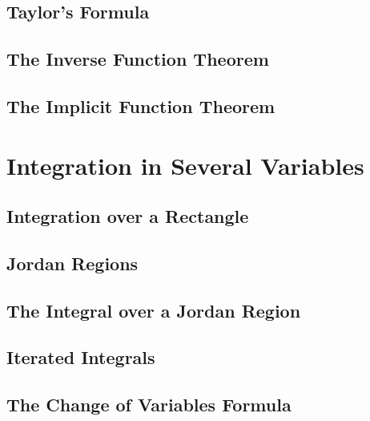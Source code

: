 \documentclass[12pt]{book}
\begin{document}
\section{Taylor's Formula}


\section{The Inverse Function Theorem}

\section{The Implicit Function Theorem}




\chapter{Integration in Several Variables}
\section{Integration over a Rectangle}


\section{Jordan Regions}

\section{The Integral over a Jordan Region}


\section{Iterated Integrals}

\section{The Change of Variables Formula}
\end{document}
